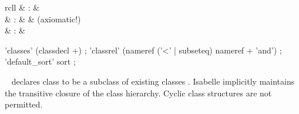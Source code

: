\begin{isabellebody}
\endisatagML
{\isafoldML}%
%
\isadelimML
%
\endisadelimML
%
\isamarkuptrue%
%
\isamarkuptrue%
%
\begin{isamarkuptext}%
\begin{matharray}{rcll}
    \hypertarget{command.classes}{\hyperlink{command.classes}{\mbox{}}} & : &  \\
    \hypertarget{command.classrel}{\hyperlink{command.classrel}{\mbox{}}} & : &  & (axiomatic!) \\
    \hypertarget{command.default-sort}{\hyperlink{command.default-sort}{\mbox{}}} & : & 
  \end{matharray}

  \begin{rail}
    'classes' (classdecl +)
    ;
    'classrel' (nameref ('<' | subseteq) nameref + 'and')
    ;
    'default_sort' sort
    ;
  \end{rail}

  \begin{description}

  \item \hyperlink{command.classes}{\mbox{}}~ declares class
   to be a subclass of existing classes .
  Isabelle implicitly maintains the transitive closure of the class
  hierarchy.  Cyclic class structures are not permitted.


\end{description}
\end{isamarkuptext}
\end{isabellebody}
